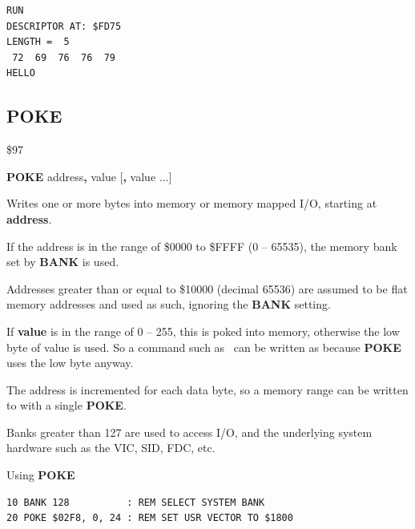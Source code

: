 \begin{description}[leftmargin=2cm,style=nextline]
\begin{tcolorbox}[colback=black,coltext=white]
\begin{verbatim}
RUN
DESCRIPTOR AT: $FD75
LENGTH =  5
 72  69  76  76  79
HELLO
\end{verbatim}
\end{tcolorbox}
\end{description}


\newpage
\subsection{POKE}
\begin{description}[leftmargin=2cm,style=nextline]
\item [Token:]    \$97

\item [Format:]   {\bf POKE} address{\bf,} value [{\bf,} value ...]

\item [Returns:]  Writes one or more bytes into memory or memory mapped I/O, starting at {\bf address}.

                  If the address is in the range of \$0000 to \$FFFF (0 -- 65535), the memory bank set by {\bf BANK} is used.

                  Addresses greater than or equal to \$10000 (decimal 65536) are assumed to be flat memory addresses and used as such, ignoring the {\bf BANK} setting.

                  If {\bf value} is in the range of 0 -- 255, this is poked into memory, otherwise the low byte of value is used. So a command such as  can be written as  because {\bf POKE} uses the low byte anyway.

\item [Remarks:]  The address is incremented for each data byte, so a memory range can be written to with a single {\bf POKE}.

                  Banks greater than 127 are used to access I/O, and the underlying system hardware such as the VIC, SID, FDC, etc.

\item [Example:]  Using {\bf POKE}

\begin{tcolorbox}[colback=black,coltext=white]
\verbatimfont{\codefont}
\begin{verbatim}
10 BANK 128          : REM SELECT SYSTEM BANK
20 POKE $02F8, 0, 24 : REM SET USR VECTOR TO $1800
\end{verbatim}
\end{tcolorbox}
\end{description}

